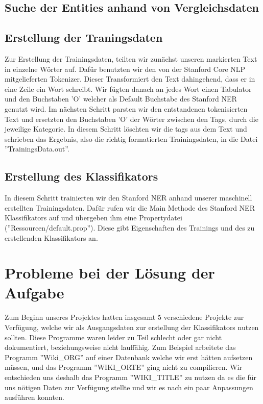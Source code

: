 \documentclass[a4paper]{article}
\begin{document}
\subsection{Suche der Entities anhand von Vergleichsdaten}
\subsection{Erstellung der Traningsdaten}
Zur Erstellung der Trainingsdaten, teilten wir zunächst unseren markierten Text in einzelne Wörter auf. Dafür benutzten wir den von der Stanford Core NLP mitgelieferten Tokenizer. Dieser Transformiert den Text dahingehend, dass er in eine Zeile ein Wort schreibt. Wir fügten danach an jedes Wort einen Tabulator und den Buchstaben 'O' welcher als Default Buchstabe des Stanford NER genutzt wird.
Im nächsten Schritt parsten wir den entstandenen tokenisierten Text und ersetzten den Buchstaben 'O' der Wörter zwischen den Tags, durch die jeweilige Kategorie. In diesem Schritt löschten wir die tags aus dem Text und schrieben das Ergebnis, also die richtig formatierten Trainingsdaten, in die Datei ''TrainingsData.out''.

\subsection{Erstellung des Klassifikators}
In diesem Schritt trainierten wir den Stanford NER anhand unserer maschinell erstellten Trainingsdaten. Dafür rufen wir die Main Methode des Stanford NER Klassifikators auf und übergeben ihm eine Propertydatei (''Ressourcen/default.prop''). Diese gibt Eigenschaften des Trainings und des zu erstellenden Klassifikators an.

\section{Probleme bei der Lösung der Aufgabe}
Zum Beginn unseres Projektes hatten insgesamt 5 verschiedene Projekte zur Verfügung, welche wir als Ausgangsdaten zur erstellung der Klassifikators nutzen sollten. Diese Programme waren leider zu Teil schlecht oder gar nicht dokumentiert, beziehungsweise nicht lauffähig. Zum Beispiel arbeitete das Programm ''Wiki\_ORG'' auf einer Datenbank welche wir erst hätten aufsetzen müssen, und  das Programm ''WIKI\_ORTE'' ging nicht zu compilieren. Wir entschieden uns deshalb das Programm ''WIKI\_TITLE'' zu nutzen da es die für uns nötigen Daten zur Verfügung stellte und wir es nach ein paar Anpassungen ausführen konnten.
\end{document}
